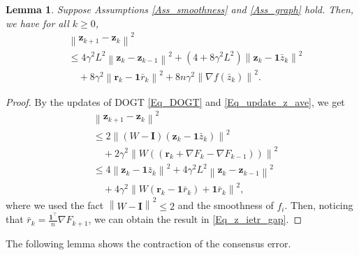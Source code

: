 \documentclass[letterpaper, 10 pt, conference]{ieeeconf}
\newtheorem{Lem}{Lemma}
\begin{document}
\begin{Lem}\label{Lem_z_iter_gap}
Suppose Assumptions \ref{Ass_smoothness} and \ref{Ass_graph} hold. Then, we have for all $ k \geqslant 0$,
\begin{equation}\label{Eq_z_ietr_gap}
\begin{aligned}
&\left\| \mathbf{z}_{k+1}-\mathbf{z}_k \right\| ^2
\\
&\leqslant 4\gamma ^2L^2\left\| \mathbf{z}_k-\mathbf{z}_{k-1} \right\| ^2+\left( 4+8\gamma ^2L^2 \right) \left\| \mathbf{z}_k-\mathbf{1}\bar{z}_k \right\| ^2
\\
 &\quad+8\gamma ^2\left\| \mathbf{r}_k-\mathbf{1}\bar{r}_k \right\| ^2+8n\gamma ^2\left\| \nabla f\left( \bar{z}_k \right) \right\| ^2.
\end{aligned}
\end{equation}
\end{Lem}

\begin{proof}
By the updates of DOGT \eqref{Eq_DOGT} and \eqref{Eq_update_z_ave}, we get
\begin{equation*}
\begin{aligned}
&\left\| \mathbf{z}_{k+1}-\mathbf{z}_k \right\| ^2
\\
&\leqslant 2\left\| \left( W-\mathbf{I} \right) \left( \mathbf{z}_k-\mathbf{1}\bar{z}_k \right) \right\| ^2
\\
&\quad +2\gamma ^2\left\| W\left( \left( \mathbf{r}_k+\nabla F_k-\nabla F_{k-1} \right) \right) \right\| ^2
\\
&\leqslant 4\left\| \mathbf{z}_k-\mathbf{1}\bar{z}_k \right\| ^2+4\gamma ^2L^2\left\| \mathbf{z}_k-\mathbf{z}_{k-1} \right\| ^2
\\
&\quad +4\gamma ^2\left\| W\left( \mathbf{r}_k-\mathbf{1}\bar{r}_k \right) +\mathbf{1}\bar{r}_k \right\| ^2,
\end{aligned}
\end{equation*}
where we used the fact $\left\| W-\mathbf{I} \right\| ^2\leqslant 2$ and the smoothness of $f_i$.
Then, noticing that $\bar{r}_k=\frac{\mathbf{1}^{\top}}{n}\nabla F_{k+1}$, we can obtain the result in \eqref{Eq_z_ietr_gap}.
\end{proof}

The following lemma shows the contraction of the consensus error.
\end{document}

